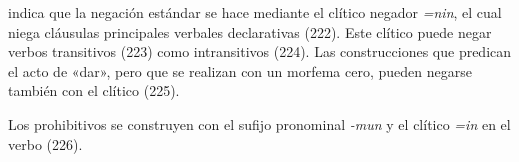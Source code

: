\textcolor{MidnightBlue}{\citet{vaisser}} indica que la negación estándar se hace mediante el clítico negador {\setmainfont{Charis SIL} \textit{=nin}}, el cual niega cláusulas principales verbales declarativas (222). Este clítico puede negar verbos transitivos (223) como intransitivos (224). Las construcciones que predican el acto de «dar», pero que se realizan con un morfema cero, pueden negarse también con el clítico (225).

Los prohibitivos se construyen con el sufijo pronominal {\setmainfont{Charis SIL} \textit{-mun}} y el clítico {\setmainfont{Charis SIL} \textit{=in}} en el verbo (226).